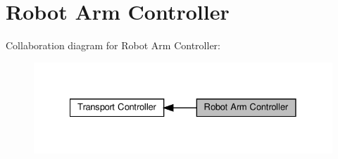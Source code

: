 \hypertarget{group__group__arm__controller}{}\section{Robot Arm Controller}
\label{group__group__arm__controller}
Collaboration diagram for Robot Arm Controller\+:\nopagebreak
\begin{figure}[H]
\begin{center}
\leavevmode
\includegraphics[width=328pt]{d3/d63/group__group__arm__controller}
\end{center}
\end{figure}

